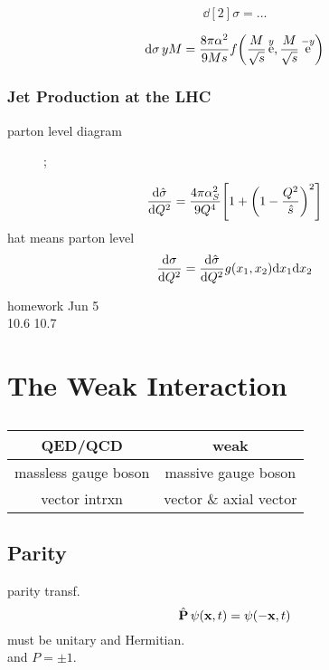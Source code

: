 \documentclass[a4paper]{article}
\DeclareMathOperator{\e}{\mathrm{e}}
\DeclareMathOperator{\hP}{\hat{\vb{P}}}          %
\newcommand{\pa}{particle}
\numberwithin{equation}{section}
\begin{document}
\begin{equation}\label{key}
\dd[2]\sigma = ...
\end{equation}

\begin{equation}\label{key}
\dd{\sigma}{y}{M} = \dfrac{8\pi\alpha^2}{9Ms} f\qty(\dfrac{M}{\sqrt{s}}\e^y,\dfrac{M}{\sqrt{s}}\e^{-y})
\end{equation}

\subsubsection{Jet Production at the LHC}
parton level diagram
\begin{figure}[H]
	\centering
	\feynmandiagram [vertical = b to e]{
		a [\pa=q] -- [fermion] b -- [fermion] c [\pa=q],
		b -- [gluon] e,
		d [\pa=q] -- [fermion] e -- [fermion] f [\pa=q],
	};
\end{figure}
\begin{equation}\label{key}
\dv{\hat\sigma}{Q^2} = \dfrac{4\pi\alpha_S^2}{9Q^4}\qty[1 + \qty(1 - \dfrac{Q^2}{\hat{s}})^2]
\end{equation}
hat means parton level
\begin{equation}\label{key}
\dv{\sigma}{Q^2} = \dv{\hat\sigma}{Q^2} g(x_1,x_2)\dd x_1 \dd x_2
\end{equation}

homework Jun 5\\
10.6 10.7\\

\section{The Weak Interaction}
\subsection{}
\begin{table}[H]
	\begin{tabular}{|c|c|}
		\hline
		QED/QCD & weak\\ \hline
		massless gauge boson & massive gauge boson\\ \hline
		vector intrxn & vector \& axial vector\\ \hline
	\end{tabular}
\end{table}
\subsection{Parity}
parity transf.
\begin{equation}\label{key}
\hP\psi(\vb{x},t) = \psi(-\vb{x},t)
\end{equation}
must be unitary and Hermitian.\\
and $ P = \pm 1 $.
\end{document}
